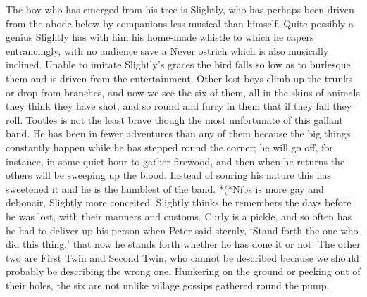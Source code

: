 \begin{stagedir}
The boy who has emerged from his tree is Slightly,
who has perhaps been driven from the abode below by companions less musical than himself.
Quite possibly a genius Slightly has with him his home-made whistle to which he capers entrancingly,
with no audience save a Never ostrich which is also musically inclined.
Unable to imitate Slightly’s graces the bird falls so low as to burlesque them
and is driven from the entertainment.
Other lost boys climb up the trunks or drop from branches,
and now we see the six of them, all in the skins of animals they think they have shot,
and so round and furry in them that if they fall they roll.
Tootles is not the least brave though the most unfortunate of this gallant band.
He has been in fewer adventures than any of them
because the big things constantly happen while he has stepped round the corner;
he will go off, for instance, in some quiet hour to gather firewood,
and then when he returns the others will be sweeping up the blood.
Instead of souring his nature this has sweetened it and he is the humblest of the band.
*(*Nibs is more gay and debonair, Slightly more conceited.
Slightly thinks he remembers the days before he was lost, with their manners and customs.
Curly is a pickle, and so often has he had to deliver up his person when Peter said sternly,
‘Stand forth the one who did this thing,’ that now he stands forth whether he has done it or not.
The other two are First Twin and Second Twin,
who cannot be described because we should probably be describing the wrong one.
Hunkering on the ground or peeking out of their holes,
the six are not unlike village gossips gathered round the pump.
\end{stagedir}

